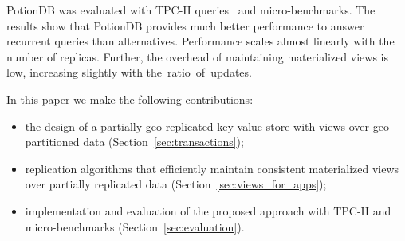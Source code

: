 \documentclass[sigplan,twocolumn,review,anonymous]{acmart}
\newcommand{\andre}[1]{\nbnote{Andre}{blue}{#1}}
\newcommand{\nuno}[1]{\nbnote{Nuno}{red}{#1}}
\begin{document}
PotionDB was evaluated with \mbox{TPC-H} queries~\cite{tpch} and micro-benchmarks.
The results show that PotionDB provides much better performance to answer recurrent queries
than alternatives.
Performance scales almost linearly with the number of replicas. %
Further, the overhead of maintaining materialized views is low, increasing slightly with
\mbox{the ratio of updates.}




In this paper we make the following contributions:
\begin{itemize}[noitemsep,topsep=0pt,parsep=0pt,partopsep=0pt,leftmargin=*]
	\item 
	the design of a partially geo-replicated key-value store with 
	views over geo-partitioned data (Section~\ref{sec:transactions}); 
	\item replication algorithms that efficiently maintain consistent materialized views over 
	partially replicated data (Section~\ref{sec:views_for_apps});
	 \item implementation and evaluation of the proposed approach with TPC-H and micro-benchmarks
	 (Section~\ref{sec:evaluation}).
\end{itemize}

\end{document}
